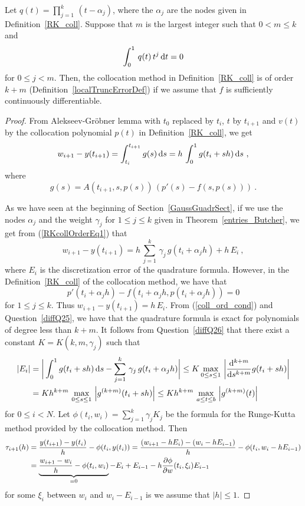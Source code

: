 \begin{theorem}
Let $\displaystyle q(t) = \prod_{j=1}^k\,(t-\alpha_j)$, where the
$\alpha_j$ are the nodes given in Definition~\ref{RK_coll}.  Suppose
that $m$ is the largest integer such that $0 < m \leq k$ and
\begin{equation} \label{coll_ord_cond} 
\int_0^1 \, q(t)\,t^j\dx{t}  = 0
\end{equation}
for $0 \leq j < m$.  Then, the collocation method
in Definition~\ref{RK_coll} is of order $k+m$
(Definition~\ref{localTruncErrorDef}) if we assume that $f$ is
sufficiently continuously differentiable.
\label{RKcollOrder}
\end{theorem}

\begin{proof}
From Alekseev-Gr\"{o}bner lemma with $t_0$ replaced by $t_i$, $t$ by
$t_{i+1}$ and $v(t)$ by the collocation polynomial $p(t)$ in
Definition~\ref{RK_coll}, we get
\begin{equation}\label{RKcollOrderEq1}
w_{i+1} - y(t_{i+1}) = \int_{t_i}^{t_{i+1}} g(s) \dx{s}
= h\,\int_0^1 g(t_i+s h) \dx{s} \ ,
\end{equation}
where
\[
 g(s) = A(t_{i+1},s,p(s))\,\left( p'(s) - f(s,p(s)) \right) \ .
\]

As we have seen at the beginning of Section~\ref{GaussGuadrSect}, if
we use the nodes $\alpha_j$ and the weight $\gamma_j$ for $1\leq j \leq k$
given in Theorem~\ref{entries_Butcher}, we get from
(\ref{RKcollOrderEq1}) that
\[
w_{i+1} - y(t_{i+1}) = h\, \sum_{j=1}^k\,\gamma_j\, g(t_i+\alpha_j h) +
h\,E_i \ ,
\]
where $E_i$ is the discretization error of the quadrature formula.
However, in the Definition~\ref{RK_coll} of the collocation method, we
have that
\[
p'(t_i+\alpha_j h) - f(t_i+\alpha_j h,p(t_i+\alpha_j h)) =0
\]
for $1 \leq j \leq k$.  Thus $w_{i+1} - y(t_{i+1}) = h\,E_i$.
From (\ref{coll_ord_cond}) and Question~\ref{diffQ25}, we have
that the quadrature formula is exact for polynomials of degree less
than $k+m$.  It follows from Question~\ref{diffQ26}
that there exist a constant $K = K(k,m,\gamma_j)$ such that
\begin{align*}
|E_i| &= \bigg| \int_0^1 g(t_i+s h) \dx{s} -
\sum_{j=1}^k\,\gamma_j\, g(t_i+\alpha_j h) \bigg|
\leq K \max_{0\leq s \leq 1}\, \left| \dfdxn{g(t_i + s h)}{s}{k+m}\right| \\
& = K h^{k+m}\,\max_{0\leq s \leq 1}\, \left| g^{(k+m)}(t_i + s h) \right| 
\leq K h^{k+m}\,\max_{a\leq t \leq b}\, \left| g^{(k+m)}(t) \right|
\end{align*}
for $0\leq i <N$.  Let
$\displaystyle \phi(t_i,w_i) = \sum_{j=1}^k\gamma_j K_j$ be the
formula for the Runge-Kutta method provided by the collocation method.
Then
\begin{align*}
\tau_{i+1}(h) &= \frac{y(t_{i+1}) - y(t_i)}{h} - \phi(t_i,y(t_i))
= \frac{(w_{i+1} - h E_i) - (w_i - h E_{i-1})}{h} -
\phi(t_i,w_i - h E_{i-1}) \\
&= \underbrace{\frac{w_{i+1} - w_i}{h} - \phi(t_i,w_i)}_{=0}
- E_i + E_{i-1} - h \pdydx{\phi}{w}(t_i,\xi_i)E_{i-1}
\end{align*}
for some $\xi_i$ between $w_i$ and $w_i - E_{i-1}$ is we assume that
$|h|\leq 1$.


\end{proof}
